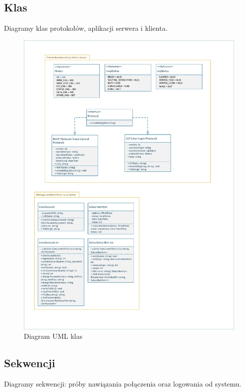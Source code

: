 \documentclass[12pt,a4paper]{article}
\begin{document}
	\pagebreak
	\subsection{Klas}
	\par Diagramy klas protokołów, aplikacji serwera i klienta.
	\begin{figure}[h!]
		\begin{center}
			\includegraphics*[width=.8\textwidth]{UML_klas_server.pdf}
		\end{center}
		\caption{Diagram UML klas}
	\end{figure}
	
	\pagebreak
	\subsection{Sekwencji}
	\par Diagramy sekwencji: próby nawiązania połączenia oraz logowania od systemu.
	
\end{document}
